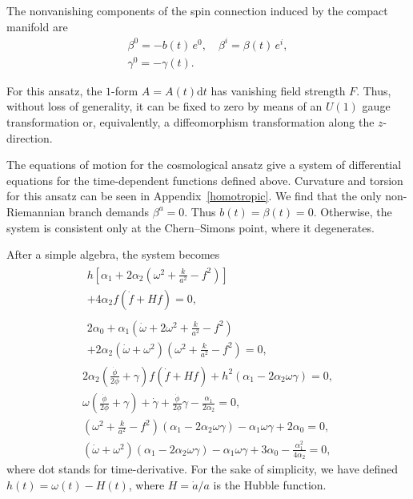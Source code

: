 \documentclass[aps,prd,12pt,superscriptaddress,showpacs,showkeys,reprint,nofootinbib]{revtex4-1}
\begin{document}
The nonvanishing components of the spin connection induced by the compact manifold are
\begin{gather}
  \beta^0 = -b(t) \, e^0,\quad \beta^i = \beta(t) \, e^i,\\
  \label{gamma cosmo}
  \gamma^0 =-\gamma(t).
\end{gather}

For this ansatz, the $1$-form $A = A(t)\text{d}t$ has vanishing field strength $F$. Thus, without loss of generality, it can be fixed to zero by means of an $U(1)$ gauge transformation or, equivalently, a diffeomorphism transformation along the $z$-direction.

The equations of motion for the cosmological ansatz give a system of differential equations for the time-dependent functions defined above. Curvature and torsion for this ansatz can be seen in Appendix~\ref{homotropic}. We find that the only non-Riemannian branch demands  $\beta^a=0$. Thus $b(t)=\beta(t)=0$. Otherwise, the system is consistent only at the Chern--Simons point, where it degenerates. 

After a simple algebra, the system becomes
\setlength\multlinegap{0pt}
\begin{gather}
  \label{eqn1}
  \begin{multlined}
    h\left[\alpha_1+2\alpha_2\left(\omega^2+\frac{k}{a^2}-f^2\right)\right] \\
    +4\alpha_2f\left(\dot{f}+Hf\right)=0,
  \end{multlined}
  \\
  \begin{multlined}
    2\alpha_0+\alpha_1\left(\dot{\omega}+2\omega^2+\frac{k}{a^2}-f^2\right)\\
    +2\alpha_2\left(\dot{\omega}+\omega^2\right)\left(\omega^2+\frac{k}{a^2}-f^2\right)=0,
  \end{multlined}
  \\
  2\alpha_2\left(\tfrac{\dot{\phi}}{2\phi}+\gamma\right)f\left(\dot{f}+Hf\right)
  +h^2\left(\alpha_1-2\alpha_2\omega\gamma\right)=0,
  \\
  \omega\left(\frac{\dot{\phi}}{2\phi}+\gamma\right)+\dot{\gamma}+\frac{\dot{\phi}}{2\phi}\gamma-\frac{\alpha_1}{2\alpha_2}=0,
  \\
  \left(\omega^2+\tfrac{k}{a^2}-f^2\right)\left(\alpha_1-2\alpha_2\omega\gamma\right)-\alpha_1\omega\gamma+2\alpha_0=0,
  \\
  \label{eqn2}
  \left(\dot{\omega}+\omega^2\right)\left(\alpha_1-2\alpha_2\omega\gamma\right)-\alpha_1
  \omega\gamma+3\alpha_0 - \frac{\alpha^2_1}{4\alpha_2}=0,
\end{gather}
where dot stands for time-derivative. For the sake of simplicity, we have defined $h(t)=\omega(t)-H(t)$, where $H=\dot{a}/a$ is the Hubble function.
\end{document}

